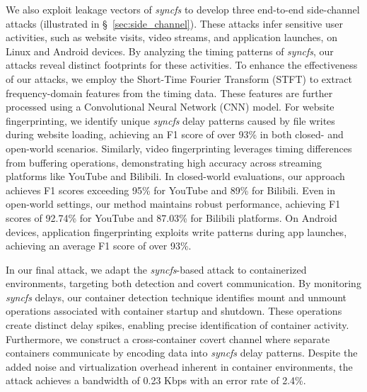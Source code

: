 We also exploit leakage vectors of \textit{syncfs} to develop three end-to-end side-channel attacks (illustrated in §~\ref{sec:side_channel}). These attacks infer sensitive user activities, such as website visits, video streams, and application launches, on Linux and Android devices. By analyzing the timing patterns of \textit{syncfs}, our attacks reveal distinct footprints for these activities. To enhance the effectiveness of our attacks, we employ the Short-Time Fourier Transform (STFT) to extract frequency-domain features from the timing data. These features are further processed using a Convolutional Neural Network (CNN) model. For website fingerprinting, we identify unique \textit{syncfs} delay patterns caused by file writes during website loading, achieving an F1 score of over 93\% in both closed- and open-world scenarios. Similarly, video fingerprinting leverages timing differences from buffering operations, demonstrating high accuracy across streaming platforms like YouTube and Bilibili. In closed-world evaluations, our approach achieves F1 scores exceeding 95\% for YouTube and 89\% for Bilibili. Even in open-world settings, our method maintains robust performance, achieving F1 scores of 92.74\% for YouTube and 87.03\% for Bilibili platforms. On Android devices, application fingerprinting exploits write patterns during app launches, achieving an average F1 score of over 93\%. 

In our final attack, we adapt the \textit{syncfs}-based attack to containerized environments, targeting both detection and covert communication. By monitoring \textit{syncfs} delays, our container detection technique identifies mount and unmount operations associated with container startup and shutdown. These operations create distinct delay spikes, enabling precise identification of container activity. Furthermore, we construct a cross-container covert channel where separate containers communicate by encoding data into \textit{syncfs} delay patterns. Despite the added noise and virtualization overhead inherent in container environments, the attack achieves a bandwidth of 0.23 Kbps with an error rate of 2.4\%. 






